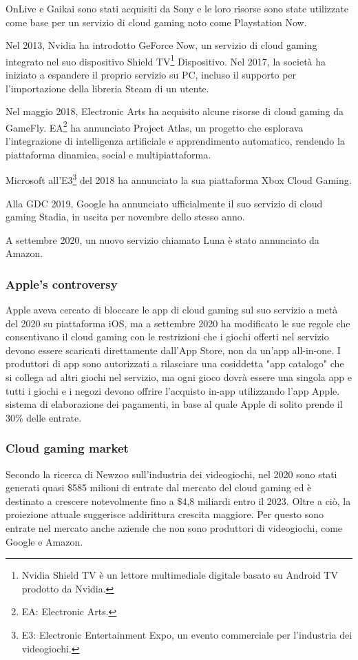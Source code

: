 OnLive e Gaikai sono stati acquisiti da Sony e le loro risorse sono state utilizzate come base per un servizio di cloud gaming noto come Playstation Now.

Nel 2013, Nvidia ha introdotto GeForce Now, un servizio di cloud gaming integrato nel suo dispositivo Shield TV\footnote{Nvidia Shield TV è un lettore multimediale digitale basato su Android TV prodotto da Nvidia.} Dispositivo. Nel 2017, la società ha iniziato a espandere il proprio servizio su PC, incluso il supporto per l'importazione della libreria Steam di un utente.

Nel maggio 2018, Electronic Arts ha acquisito alcune risorse di cloud gaming da GameFly. EA\footnote{EA: Electronic Arts.} ha annunciato Project Atlas, un progetto che esplorava l'integrazione di intelligenza artificiale e apprendimento automatico, rendendo la piattaforma dinamica, social e multipiattaforma.

Microsoft all'E3\footnote{E3: Electronic Entertainment Expo, un evento commerciale per l'industria dei videogiochi.} del 2018 ha annunciato la sua piattaforma Xbox Cloud Gaming.

Alla GDC 2019, Google ha annunciato ufficialmente il suo servizio di cloud gaming Stadia, in uscita per novembre dello stesso anno.

A settembre 2020, un nuovo servizio chiamato Luna è stato annunciato da Amazon\cite{Cloud_gaming_history}.

\subsubsection{Apple's controversy}
Apple aveva cercato di bloccare le app di cloud gaming sul suo servizio a metà del 2020 su piattaforma iOS, ma a settembre 2020 ha modificato le sue regole che consentivano il cloud gaming con le restrizioni che i giochi offerti nel servizio devono essere scaricati direttamente dall'App Store, non da un'app all-in-one. I produttori di app sono autorizzati a rilasciare una cosiddetta "app catalogo" che si collega ad altri giochi nel servizio, ma ogni gioco dovrà essere una singola app e tutti i giochi e i negozi devono offrire l'acquisto in-app utilizzando l'app Apple. sistema di elaborazione dei pagamenti, in base al quale Apple di solito prende il 30\% delle entrate\cite{Apple_controversy}.

\subsubsection{Cloud gaming market}
Secondo la ricerca di Newzoo sull'industria dei videogiochi, nel 2020 sono stati generati quasi \$585 milioni di entrate dal mercato del cloud gaming ed è destinato a crescere notevolmente fino a \$4,8 miliardi entro il 2023. Oltre a ciò, la proiezione attuale suggerisce addirittura crescita maggiore. Per questo sono entrate nel mercato anche aziende che non sono produttori di videogiochi, come Google e Amazon.

